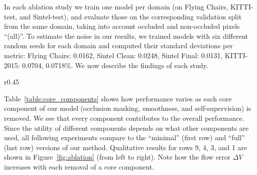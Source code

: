 \documentclass[runningheads]{llncs}
\begin{document}
In each ablation study we train one model per domain (on Flying Chairs, KITTI-test, and Sintel-test), and evaluate those on the corresponding validation split from the same domain, taking into account occluded and non-occluded pixels ``(all)''. To estimate the noise in our results, we trained models with six different random seeds for each domain and computed their standard deviations per metric: Flying Chairs: 0.0162, Sintel Clean: 0.0248, Sintel Final: 0.0131, KITTI-2015: 0.0704, 0.0718\%. We now describe the findings of each study.

\begin{wraptable}{r}{0.45\columnwidth}
     \vspace{-10pt}
    \caption{Core components: OM: occlusion masking, SM: smoothness, SS: self-supervision; ``div.'': divergence}
    \label{table:core_components}
\end{wraptable}

 Table~\ref{table:core_components} shows how performance varies as each core component of our model (occlusion masking, smoothness, and self-supervision) is removed. We see that every component contributes to the overall performance. Since the utility of different components depends on what other components are used, all following experiments compare to the ``minimal'' (first row) and ``full'' (last row) versions of our method. Qualitative results for rows 9, 4, 3, and 1 are shown in Figure~\ref{fig:ablation} (from left to right). Note how the flow error $\Delta V$ increases with each removal of a core component.
\end{document}
